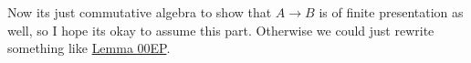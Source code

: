 \begin{exercise}{4}
\begin{enumerate}
{                Now its just commutative algebra to show that $A \to B$ is of
                finite presentation as well, so I hope its okay to assume this
                part. Otherwise we could just rewrite something like
                \href{https://stacks.math.columbia.edu/tag/00EP}{Lemma 00EP}.

            }
    \end{enumerate}
\end{exercise}


